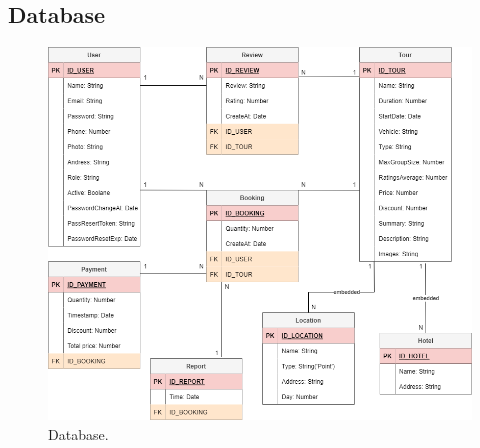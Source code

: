 \subsection{Database}

\vspace{2cm}

\begin{figure}[ht]
    \centering
    \includegraphics[width = 1.1\linewidth]{figures/ddp.png}
    \caption{Database.}
    \label{fig:example_1}
\end{figure}

\vspace{10cm}
